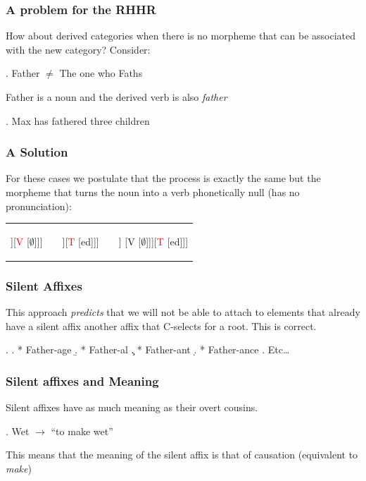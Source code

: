 \begin{frame}

\frametitle{A problem for the RHHR}

How about derived categories when there is no morpheme that can be associated with the new category?  Consider:


\ex. Father $\neq$ The one who Faths

Father is a noun and the derived verb is also \textit{father}

  
\ex.  
Max has fathered three children

\end{frame}



\begin{frame}
\frametitle{A Solution}
  For these cases we postulate that the process is exactly the same but the morpheme that turns the noun into a verb phonetically null (has no pronunciation):

\begin{tabular}[t]{lllll}
  \begin{forest}
    [\textcolor{red}{V}[ N [father-]][\textcolor{red}{V} [$\emptyset$]]] 
  \end{forest}
  &
&
   \begin{forest}
    [\textcolor{red}{T}[ V [laugh-]][\textcolor{red}{T} [ed]]] 
  \end{forest}
  &
 &
  \begin{forest}
    [\textcolor{red}{T}[ V [N [father]] [V [$\emptyset$]]][\textcolor{red}{T} [ed]]] 
  \end{forest}

\end{tabular}

\end{frame}

\begin{frame}
  \frametitle{Silent Affixes}

This approach \textit{predicts} that we will not be able to attach to elements that already have a silent affix another affix that C-selects for a root.  This is correct.

\ex.
\a. * Father-age
\b. * Father-al
\c.  * Father-ant
\d. * Father-ance
\e. Etc\dots


\end{frame}

\begin{frame}
\frametitle{Silent affixes and Meaning}

Silent affixes have as much meaning as their overt cousins.

\ex. 
Wet $\rightarrow$ ``to make wet''


This means that the meaning of the silent affix is that of causation (equivalent to \textit{make})

\end{frame}


